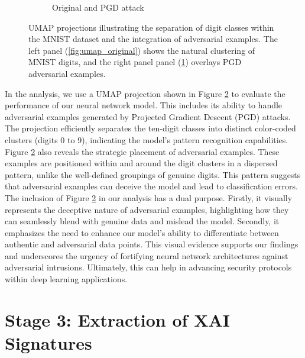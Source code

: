 \documentclass[10pt, conference, a4paper, final]{IEEEtran}
\begin{document}
\begin{figure}[!ht]
\begin{subfigure}{.50\textwidth}
        \caption{Original and PGD attack}
        \label{fig:umap_pgd}
    \end{subfigure}
    \caption{UMAP projections illustrating the separation of digit classes within the MNIST dataset and the integration of adversarial examples.
     The left panel (\ref{fig:umap_original}) shows the natural clustering of MNIST digits, and the right panel panel (\ref{fig:umap_pgd}) overlays PGD 
     adversarial examples.}
    \label{fig:umap}
\end{figure}


In the analysis, we use a UMAP projection shown in Figure \ref{fig:umap} to evaluate the performance of our neural network model. This includes 
its ability to handle adversarial examples generated by Projected Gradient Descent (PGD) attacks. The projection efficiently separates the 
ten-digit classes into distinct color-coded clusters (digits 0 to 9), indicating the model's pattern recognition capabilities. 
Figure \ref{fig:umap} also reveals the strategic placement of adversarial examples. These examples are positioned within and around the 
digit clusters in a dispersed pattern, unlike the well-defined groupings of genuine digits. This pattern suggests that adversarial examples 
can deceive the model and lead to classification errors. The inclusion of Figure \ref{fig:umap} in our analysis has a dual purpose. Firstly, 
it visually represents the deceptive nature of adversarial examples, highlighting how they can seamlessly blend with genuine data and mislead 
the model. Secondly, it emphasizes the need to enhance our model's ability to differentiate between authentic and adversarial data points.
This visual evidence supports our findings and underscores the urgency of fortifying neural network architectures against adversarial intrusions.
 Ultimately, this can help in advancing security protocols within deep learning applications.




\section{Stage 3: Extraction of XAI Signatures}
\end{document}
